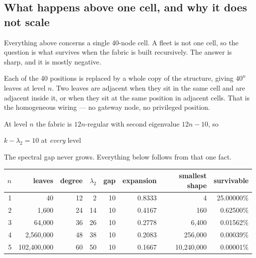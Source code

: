 \documentclass[11pt,letterpaper]{article}
\newcommand{\tagbox}[3]{\tikz[baseline=(X.base)]{\node[inner xsep=3.5pt,inner ysep=1.4pt,rounded corners=1.6pt,fill=#1,text=#2,font=\bfseries\sffamily\tiny] (X) {#3};}}
\newcommand{\PROVED}{\tagbox{greenlite}{green!45!black}{PROVED}}
\begin{document}
\subsection{What happens above one cell, and why it does not scale}

Everything above concerns a single 40-node cell. A fleet is not one cell, so the
question is what survives when the fabric is built recursively. The answer is
sharp, and it is mostly negative. \PROVED

\begin{plainbox}
Each of the 40 positions is replaced by a whole copy of the structure, giving
$40^n$ leaves at level $n$. Two leaves are adjacent when they sit in the same
cell and are adjacent inside it, or when they sit at the same position in
adjacent cells. That is the homogeneous wiring --- no gateway node, no
privileged position.
\end{plainbox}

At level $n$ the fabric is $12n$-regular with second eigenvalue $12n-10$, so

\begin{center}
\begin{tcolorbox}[enhanced,colback=white,colframe=navy,boxrule=1pt,arc=2pt,width=0.72\textwidth,halign=center]
$k - \lambda_2 = 10$ \quad at \emph{every} level
\end{tcolorbox}
\end{center}

The spectral gap never grows. Everything below follows from that one fact.

\begin{center}
\renewcommand{\arraystretch}{1.2}
\begin{tabular}{rrrrrrrr}
\toprule
$n$ & leaves & degree & $\lambda_2$ & gap & expansion & smallest shape & survivable \\
\midrule
1 & 40 & 12 & 2 & 10 & 0.8333 & 4 & 25.00000\% \\
2 & 1,600 & 24 & 14 & 10 & 0.4167 & 160 & 0.62500\% \\
3 & 64,000 & 36 & 26 & 10 & 0.2778 & 6,400 & 0.01562\% \\
4 & 2,560,000 & 48 & 38 & 10 & 0.2083 & 256,000 & 0.00039\% \\
5 & 102,400,000 & 60 & 50 & 10 & 0.1667 & 10,240,000 & 0.00001\% \\
\bottomrule
\end{tabular}
\end{center}
\end{document}
